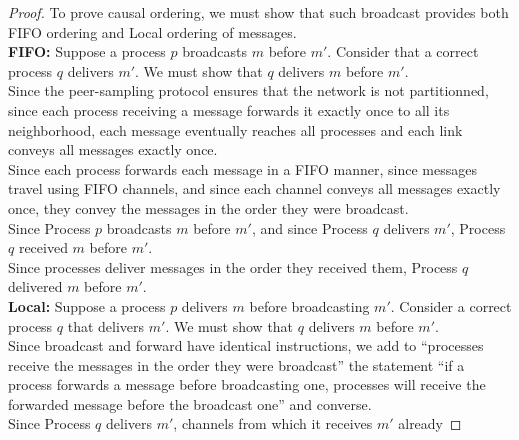 \begin{proof}  To
  prove causal ordering, we must show that such broadcast provides both FIFO
  ordering and Local ordering of messages. \\
  \textbf{FIFO:} Suppose a process $p$ broadcasts $m$ before $m'$. Consider that
  a correct process $q$ delivers $m'$. We must show that $q$ delivers $m$ before
  $m'$. \\
  Since the peer-sampling protocol ensures that the network is not partitionned,
  since each process receiving a message forwards it exactly once to all its
  neighborhood, each message eventually reaches all processes and each link
  conveys all messages exactly once. \\
  Since each process forwards each message in a FIFO manner, since messages
  travel using FIFO channels, and since each channel conveys all messages
  exactly once, they convey the messages in the order they were broadcast. \\
  Since Process $p$ broadcasts $m$ before $m'$, and since Process $q$ delivers
  $m'$, Process $q$ received $m$ before $m'$. \\
  Since processes deliver messages in the order they received them, Process $q$
  delivered $m$ before $m'$. \\
  \textbf{Local:} Suppose a process $p$ delivers $m$ before broadcasting
  $m'$. Consider a correct process $q$ that delivers $m'$. We must show that $q$
  delivers $m$ before $m'$. \\
  Since broadcast and forward have identical instructions, we add to ``processes
  receive the messages in the order they were broadcast'' the statement ``if a
  process forwards a message before broadcasting one, processes will receive the
  forwarded message before the broadcast one'' and converse. \\
  Since Process $q$ delivers $m'$, channels from which it receives $m'$ already

\end{proof}
